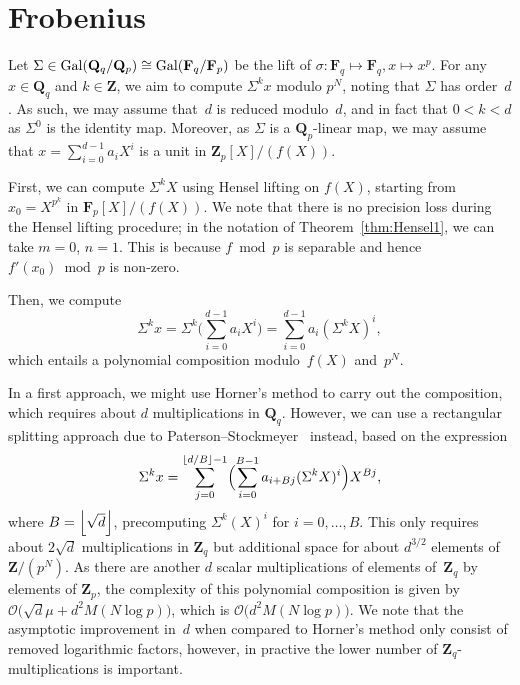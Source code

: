 \section{Frobenius}

Let $\Sigma \in \operatorname{Gal}(\mathbf{Q}_q/\mathbf{Q}_p) \cong \operatorname{Gal}(\mathbf{F}_q/\mathbf{F}_p)$ 
be the lift of $\sigma \colon \mathbf{F}_q \mapsto \mathbf{F}_q, x \mapsto x^p$. 
For any $x \in \mathbf{Q}_q$ and $k \in \mathbf{Z}$, we aim to compute $\Sigma^k x$ 
modulo $p^N$, noting that $\Sigma$ has order~$d$.  As such, we may assume that~$d$ 
is reduced modulo~$d$, and in fact that $0 < k < d$ as $\Sigma^0$ is the identity map.
Moreover, as $\Sigma$ is a $\mathbf{Q}_p$-linear map, we may assume that 
$x = \sum_{i=0}^{d-1} a_i X^i$ is a unit in $\mathbf{Z}_p[X]/(f(X))$.  

First, we can compute $\Sigma^k X$ using Hensel lifting on $f(X)$, 
starting from $x_0 = X^{p^k}$ in $\mathbf{F}_p[X] / (f(X))$.  We note 
that there is no precision loss during the Hensel lifting procedure;  
in the notation of Theorem~\ref{thm:Hensel1}, we can take $m = 0$, $n = 1$. 
This is because $f \bmod p$ is separable and hence $f'(x_0) \bmod p$ is 
non-zero.

Then, we compute 
\begin{equation}
\Sigma^k x = 
    \Sigma^k \bigl( \sum_{i=0}^{d-1} a_i X^i \bigr) = 
    \sum_{i=0}^{d-1} a_i (\Sigma^k X)^i, 
\end{equation}
which entails a polynomial composition modulo~$f(X)$ and~$p^N$.

In a first approach, we might use Horner's method to carry out the 
composition, which requires about $d$ multiplications in $\mathbf{Q}_q$.
However, we can use a rectangular splitting approach due to 
Paterson--Stockmeyer~\citep{PatersonStockmeyer1973} instead, based 
on the expression 
\begin{equation}
\Sigma^k x = \sum_{j=0}^{\left\lfloor d/B\right\rfloor-1} \Bigl( \sum_{i=0}^{B-1} a_{i+Bj} (\Sigma^k X)^i  \Bigr) X^{Bj},
\end{equation}
where $B = \left\lfloor\sqrt{d}\right\rfloor$, precomputing $\Sigma^k(X)^i$ for $i = 0, \dotsc, B$. 
This only requires about $2 \sqrt{d}$ multiplications in $\mathbf{Z}_q$ 
but additional space for about $d^{3/2}$ elements of $\mathbf{Z}/(p^N)$.  
As there are another $d$ scalar multiplications of elements of~$\mathbf{Z}_q$ 
by elements of $\mathbf{Z}_p$, the complexity of this polynomial composition 
is given by $\mathcal{O}\bigl(\sqrt{d} \mu + d^2 M(N \log p)\bigr)$, which 
is $\mathcal{O}\bigl(d^2 M(N \log p)\bigr)$.  We note that the asymptotic 
improvement in~$d$ when compared to Horner's method only consist of removed 
logarithmic factors, however, in practive the lower number of 
$\mathbf{Z}_q$-multiplications is important.

